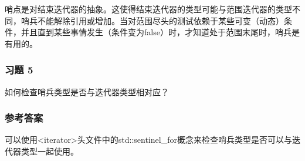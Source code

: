 哨点是对结束迭代器的抽象。这使得结束迭代器的类型可能与范围迭代器的类型不同，哨兵不能解除引用或增加。当对范围尽头的测试依赖于某些可变（动态）条件，并且直到某些事情发生（条件变为false）时，才知道处于范围末尾时，哨兵是有用的。

\subsubsection{习题 5}

如何检查哨兵类型是否与迭代器类型相对应？

\subsubsection{参考答案}

可以使用<iterator>头文件中的std::sentinel_for概念来检查哨兵类型是否可以与迭代器类型一起使用。












